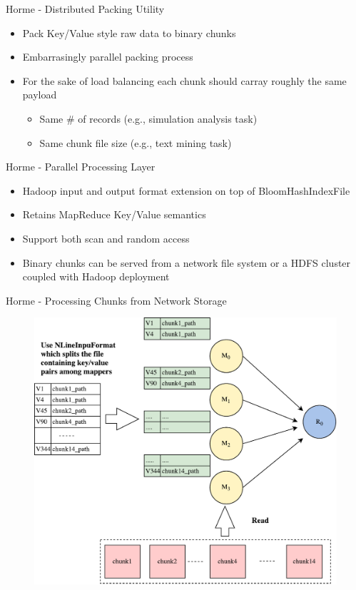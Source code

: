 \documentclass[newPxFont]{beamer}
\begin{document}
\begin{frame}[c]{Horme - Distributed Packing Utility}
  \begin{itemize}
    \item Pack Key/Value style raw data to binary chunks
    \item Embarrasingly parallel packing process
    \item For the sake of load balancing each chunk should carray roughly the same payload
    \begin{itemize}
      \item Same \# of records (e.g., simulation analysis task)
      \item Same chunk file size (e.g., text mining task)
    \end{itemize}
  \end{itemize}
\end{frame}

\begin{frame}[c]{Horme - Parallel Processing Layer}
  \begin{itemize}
    \item Hadoop input and output format extension on top of BloomHashIndexFile
    \item Retains MapReduce Key/Value semantics 
    \item Support both scan and random access 
    \item Binary chunks can be served from a network file system or a HDFS cluster coupled with Hadoop deployment
  \end{itemize}
\end{frame}

\begin{frame}[c]{Horme - Processing Chunks from Network Storage}
\begin{figure}[t]
  \includegraphics[scale=0.4]{horme-with-pfs}
  \centering
\end{figure}
\end{frame}
\end{document}
